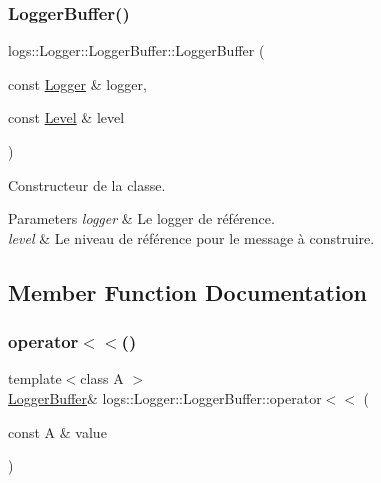 \subsubsection{\texorpdfstring{Logger\+Buffer()}{LoggerBuffer()}}
{\footnotesize\ttfamily logs\+::\+Logger\+::\+Logger\+Buffer\+::\+Logger\+Buffer (\begin{DoxyParamCaption}\item[{const \hyperlink{classlogs_1_1Logger}{Logger} \&}]{logger,  }\item[{const \hyperlink{classlogs_1_1Level}{Level} \&}]{level }\end{DoxyParamCaption})}



Constructeur de la classe. 


\begin{DoxyParams}{Parameters}
{\em logger} & Le logger de référence. \\
\hline
{\em level} & Le niveau de référence pour le message à construire. \\
\hline
\end{DoxyParams}


\subsection{Member Function Documentation}
\mbox{\label{classlogs_1_1Logger_1_1LoggerBuffer_abb331f69c4ced4db2a19140eae18c7eb}} 
\subsubsection{\texorpdfstring{operator$<$$<$()}{operator<<()}\hspace{0.1cm}{\footnotesize\ttfamily [1/2]}}
{\footnotesize\ttfamily template$<$class A $>$ \\
\hyperlink{classlogs_1_1Logger_1_1LoggerBuffer}{Logger\+Buffer}\& logs\+::\+Logger\+::\+Logger\+Buffer\+::operator$<$$<$ (\begin{DoxyParamCaption}\item[{const A \&}]{value }\end{DoxyParamCaption})\hspace{0.3cm}{\ttfamily [inline]}}




